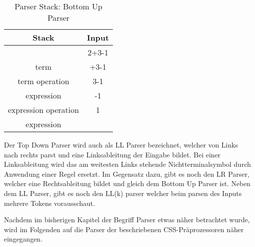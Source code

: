 \begin{table}[h]
          \centering
          \begin{tabular}{|c|c|} \hline
                  \textbf{Stack} & \textbf{Input}\\
                   \hline
                     & 2+3-1\\ \hline
                    term & +3-1\\ \hline
                    term operation &3-1\\ \hline
                    expression & -1\\ \hline
	         expression operation & 1\\ \hline
	        expression & \\ \hline
          \end{tabular}
          \caption{
	       Parser Stack: Bottom Up Parser
          }
         \label{table:Vergleich Browser}
\end{table}\autocite[]{Garsiel.}\newline\newline
Der Top Down Parser wird auch als LL Parser bezeichnet, welcher von Links nach rechts parst und eine Linksableitung der Eingabe bildet. Bei einer Linksableitung wird das am weitesten Links stehende Nichtterminalsymbol durch Anwendung einer Regel ersetzt. Im Gegensatz dazu, gibt es noch den LR Parser, welcher eine Rechtsableitung bildet und gleich dem Bottom Up Parser ist.\newline
Neben dem LL Parser, gibt es noch den LL(k) parser welcher beim parsen des Inputs mehrere Tokens vorausschaut. 

Nachdem im bisherigen Kapitel der Begriff Parser etwas näher betrachtet wurde, wird im Folgenden auf die Parser der beschriebenen CSS-Präprozessoren näher eingegangen.

